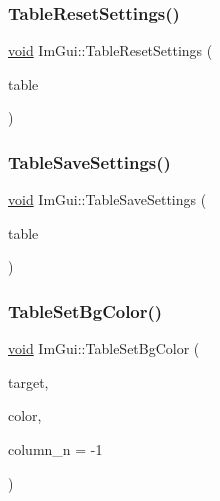 \subsubsection{\texorpdfstring{Table\+Reset\+Settings()}{TableResetSettings()}}
{\footnotesize\ttfamily \hyperlink{imgui__impl__opengl3__loader_8h_ac668e7cffd9e2e9cfee428b9b2f34fa7}{void} Im\+Gui\+::\+Table\+Reset\+Settings (\begin{DoxyParamCaption}\item[{\hyperlink{structImGuiTable}{Im\+Gui\+Table} $\ast$}]{table }\end{DoxyParamCaption})}

\mbox{\label{namespaceImGui_aadf0917c8bc98aaab0bf3c7667b19afe}} 
\subsubsection{\texorpdfstring{Table\+Save\+Settings()}{TableSaveSettings()}}
{\footnotesize\ttfamily \hyperlink{imgui__impl__opengl3__loader_8h_ac668e7cffd9e2e9cfee428b9b2f34fa7}{void} Im\+Gui\+::\+Table\+Save\+Settings (\begin{DoxyParamCaption}\item[{\hyperlink{structImGuiTable}{Im\+Gui\+Table} $\ast$}]{table }\end{DoxyParamCaption})}

\mbox{\label{namespaceImGui_ae8fa85b0cea3c12f73d9432cab64d50a}} 
\subsubsection{\texorpdfstring{Table\+Set\+Bg\+Color()}{TableSetBgColor()}}
{\footnotesize\ttfamily \hyperlink{imgui__impl__opengl3__loader_8h_ac668e7cffd9e2e9cfee428b9b2f34fa7}{void} Im\+Gui\+::\+Table\+Set\+Bg\+Color (\begin{DoxyParamCaption}\item[{Im\+Gui\+Table\+Bg\+Target}]{target,  }\item[{Im\+U32}]{color,  }\item[{int}]{column\+\_\+n = {\ttfamily -\/1} }\end{DoxyParamCaption})}

